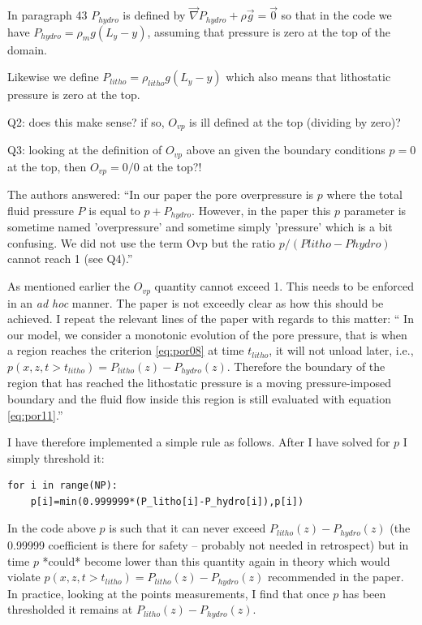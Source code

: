 In paragraph 43 $P_{hydro}$ is defined by $\vec\nabla P_{hydro} + \rho \vec{g} = \vec{0}$ 
so that in the code we have $P_{hydro}=\rho_m g (L_y -y)$, 
assuming that pressure is zero at the top of the domain. 

Likewise we define $P_{litho}=\rho_{litho} g (L_y -y)$ which 
also means that lithostatic pressure is zero at the top. 

{\color{red} Q2: does this make sense? if so, $O_{vp}$ is ill defined at the top (dividing by zero)?}

{\color{red} Q3: looking at the definition of $O_{vp}$ above an given the boundary conditions $p=0$
at the top, then $O_{vp}=0/0$ at the top?!}

The authors answered: ``In our paper the pore overpressure is $p$ where the total 
fluid pressure $P$ is equal to $p + P_{hydro}$. However, in the paper this $p$ parameter 
is sometime named 'overpressure' and sometime simply 'pressure' which is a bit 
confusing. We did not use the term Ovp but the ratio $p/(Plitho-Phydro)$ cannot reach 1 (see Q4).''

As mentioned earlier the $O_{vp}$ quantity cannot exceed 1. This needs to be 
enforced in an {\it ad hoc} manner. The paper is not exceedly clear as how 
this should be achieved. I repeat the relevant lines of the paper with regards 
to this matter:
``
In our model, we consider a monotonic evolution of the pore pressure, that
is when a region reaches the criterion \eqref{eq:por08} at time $t_{litho}$, it
will not unload later, i.e., $p(x,z,t > t_{litho}) = P_{litho}(z)-P_{hydro}(z)$.
Therefore the boundary of the region that has reached the
lithostatic pressure is a moving pressure-imposed boundary
and the fluid flow inside this region is still evaluated with
equation \eqref{eq:por11}.''

I have therefore implemented a simple rule as follows. After I have solved for $p$
I simply threshold it:
\begin{lstlisting}
for i in range(NP):
    p[i]=min(0.999999*(P_litho[i]-P_hydro[i]),p[i])
\end{lstlisting}
In the code above $p$ is such that it can never exceed $P_{litho}(z)-P_{hydro}(z)$ 
(the 0.99999 coefficient is there for safety -- probably not needed in retrospect) but 
in time $p$ *could* become lower than this quantity again in theory which would violate
$p(x,z,t > t_{litho}) = P_{litho}(z)-P_{hydro}(z)$ recommended in the paper. 
In practice, looking at the points measurements, 
I find that once $p$ has been thresholded it remains at $P_{litho}(z)-P_{hydro}(z)$.

